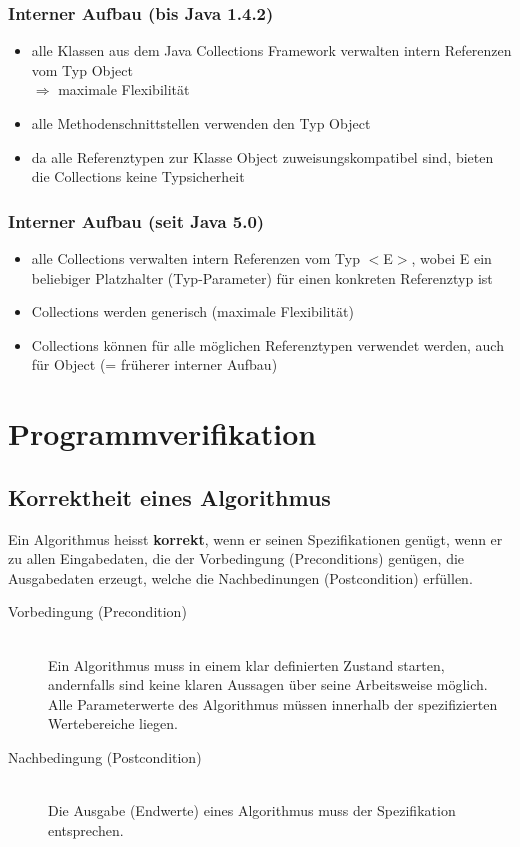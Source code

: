 \documentclass[a4paper,10pt]{article}
\newcommand{\Bold}[1]{\textbf{#1}} %
\begin{document}
\subsubsection{Interner Aufbau (bis Java 1.4.2)}
\begin{itemize}
	\item alle Klassen aus dem Java Collections Framework verwalten intern Referenzen vom Typ Object \\ $\Rightarrow$ maximale Flexibilit\"at
	\item alle Methodenschnittstellen verwenden den Typ Object
	\item da alle Referenztypen zur Klasse Object zuweisungskompatibel sind, bieten die Collections keine Typsicherheit
\end{itemize}

\subsubsection{Interner Aufbau (seit Java 5.0)}
\begin{itemize}
	\item alle Collections verwalten intern Referenzen vom Typ $<$E$>$, wobei E ein beliebiger Platzhalter (Typ-Parameter) f\"ur einen konkreten Referenztyp ist
	\item Collections werden generisch (maximale Flexibilit\"at)
	\item Collections k\"onnen f\"ur alle m\"oglichen Referenztypen verwendet werden, auch
f\"ur Object (= fr\"uherer interner Aufbau)
\end{itemize}

\newpage
\section{Programmverifikation}
\subsection{Korrektheit eines Algorithmus}
Ein Algorithmus heisst \Bold {korrekt}, wenn er seinen Spezifikationen gen\"ugt, wenn er zu allen Eingabedaten, die der Vorbedingung (Preconditions) gen\"ugen, die Ausgabedaten erzeugt, welche die Nachbedinungen (Postcondition) erf\"ullen. 
\begin{description}
	\item[Vorbedingung (Precondition)] \hfill \\
		Ein Algorithmus muss in einem klar definierten Zustand starten, andernfalls sind keine klaren Aussagen \"uber seine Arbeitsweise m\"oglich. Alle Parameterwerte des Algorithmus m\"ussen innerhalb der spezifizierten Wertebereiche liegen.
	\item[Nachbedingung (Postcondition)] \hfill \\
		Die Ausgabe (Endwerte) eines Algorithmus muss der Spezifikation entsprechen.
\end{description}
\end{document}
